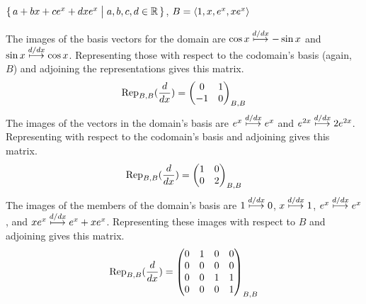 \begin{exercises}
\begin{exparts}
      \partsitem \( \set{a+bx+ce^x+dxe^{x} \suchthat a,b,c,d\in\Re} \),
         \( B=\sequence{1,x,e^x,xe^{x}} \)
    \end{exparts}
    \begin{answer}
      \begin{exparts}
        \partsitem The images of the basis vectors for the domain are
         \( \cos x\mapsunder{d/dx}-\sin x \) and
          \( \sin x\mapsunder{d/dx}\cos x \).
          Representing those with respect to the codomain's basis (again, $B$)
          and adjoining the representations gives this matrix.
          \begin{equation*}
            \rep{\frac{d}{dx}}{B,B}=
            \begin{pmatrix}
                0  &1  \\
               -1  &0
            \end{pmatrix}_{B,B}
          \end{equation*}
        \partsitem The images of the vectors in the domain's basis are 
          \( e^x\mapsunder{d/dx}e^x \) and
          \( e^{2x}\mapsunder{d/dx}2e^{2x} \).
          Representing with respect to the codomain's basis and adjoining
          gives this matrix.
          \begin{equation*}
            \rep{\frac{d}{dx}}{B,B}=
            \begin{pmatrix}
                1  &0  \\
                0  &2
            \end{pmatrix}_{B,B}
          \end{equation*}
        \partsitem The images of the members of the domain's basis are 
          \( 1\mapsunder{d/dx}0 \), 
          \( x\mapsunder{d/dx}1 \),
          \( e^{x}\mapsunder{d/dx}e^{x} \), and
          \( xe^{x}\mapsunder{d/dx}e^x+xe^x \).
          Representing these images with respect to $B$ and adjoining
          gives this matrix.
          \begin{equation*}
            \rep{\frac{d}{dx}}{B,B}=
            \begin{pmatrix}
                0  &1  &0  &0 \\
                0  &0  &0  &0 \\
                0  &0  &1  &1 \\
                0  &0  &0  &1
            \end{pmatrix}_{B,B}
          \end{equation*}
      \end{exparts}  

\end{answer}
\end{exercises}
